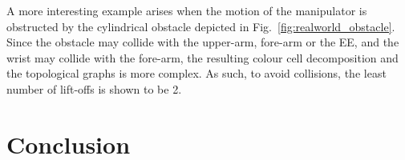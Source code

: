 \documentclass[journal]{IEEEtran}
\begin{document}
A more interesting example arises when the motion of the manipulator is obstructed by the cylindrical obstacle 
depicted in Fig.~\ref{fig:realworld_obstacle}. Since the obstacle may collide with the upper-arm, fore-arm or the EE, 
and the wrist may collide with the fore-arm, %
the resulting colour cell decomposition and the topological graphs is more complex. As such, to avoid collisions, 
the least number of lift-offs is shown to be 2. 




\section{Conclusion}
\label{sectionconclusion}

\end{document}
